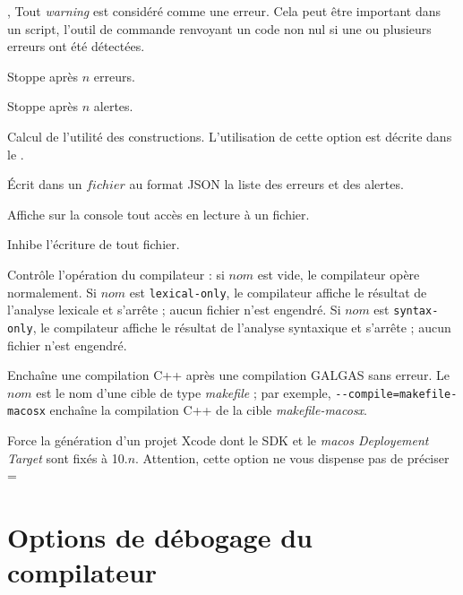 ,  Tout \emph{warning} est considéré comme une erreur. Cela peut être important dans un script, l’outil de commande renvoyant un code non nul si une ou plusieurs erreurs ont été détectées.

 Stoppe après $n$ erreurs.

 Stoppe après $n$ alertes.

 Calcul de l'utilité des constructions. L'utilisation de cette option est décrite dans le .





 Écrit dans un $fichier$ au format JSON la liste des erreurs et des alertes.


 Affiche sur la console tout accès en lecture à un fichier.


 Inhibe l'écriture de tout fichier.


 Contrôle l'opération du compilateur : si $nom$ est vide, le compilateur opère normalement. Si $nom$ est \texttt{lexical-only}, le compilateur affiche le résultat de l'analyse lexicale et s'arrête ; aucun fichier n'est engendré. Si $nom$ est \texttt{syntax-only}, le compilateur affiche le résultat de l'analyse syntaxique et s'arrête ; aucun fichier n'est engendré.





 Enchaîne une compilation C++ après une compilation GALGAS sans erreur. Le $nom$ est le nom d'une cible de type \emph{makefile} ; par exemple, \texttt{-{-}compile=makefile-macosx} enchaîne la compilation C++ de la cible \emph{makefile-macosx}.


 Force la génération d'un projet Xcode dont le SDK et le \emph{macos Deployement Target} sont fixés à 10.$n$.  Attention, cette option ne vous dispense pas de préciser \ggs=%




\section{Options de débogage du compilateur}

